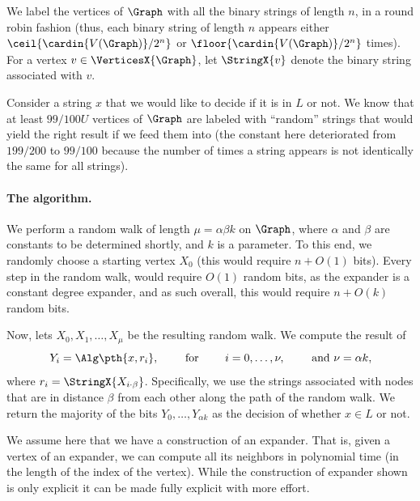 We label the vertices of $\Graph$ with all the binary strings of
length $n$, in a round robin fashion (thus, each binary string of
length $n$ appears either
\begin{math}
    \ceil{ \bigl. \cardin{V(\Graph)} / 2^n }
\end{math}
or
\begin{math}
    \floor{ \bigl. \cardin{V(\Graph)} / 2^n }
\end{math}
times). For a vertex $v \in \VerticesX{\Graph}$, let $\StringX{v}$
denote the binary string associated with $v$.

Consider a string $x$ that we would like to decide if it is in $L$ or
not. We know that at least $99/100 U$ vertices of $\Graph$ are labeled
with ``random'' strings that would yield the right result if we feed
them into \Alg (the constant here deteriorated from $199/200$ to
$99/100$ because the number of times a string appears is not
identically the same for all strings).

\paragraph*{The algorithm.}
We perform a random walk of length $\mu = \alpha \beta k$ on $\Graph$,
where $\alpha$ and $\beta$ are constants to be determined shortly, and
$k$ is a parameter. To this end, we randomly choose a starting vertex
$X_0$ (this would require $n+O(1)$ bits). Every step in the random
walk, would require $O(1)$ random bits, as the expander is a constant
degree expander, and as such overall, this would require $n + O(k)$
random bits.

Now, lets $X_0, X_1, \ldots, X_\mu$ be the resulting random walk. We
compute the result of
\begin{equation*}
    Y_i = \Alg\pth{x, r_i}, %
    \qquad \text{ for } \qquad i=0,\ldots, \altK, \qquad \text{
       and } \altK = \alpha k,
\end{equation*}
where $r_i = \StringX{X_{i\cdot \beta }}$.  Specifically, we use the
strings associated with nodes that are in distance $\beta$ from each
other along the path of the random walk.  We return the majority of
the bits $Y_0, \ldots, Y_{\alpha k}$ as the decision of whether $x \in
L$ or not.

We assume here that we have a  construction of
an expander. That is, given a vertex of an expander, we can compute
all its neighbors in polynomial time (in the length of the index of
the vertex). While the construction of expander shown is only explicit
it can be made fully explicit with more effort.


